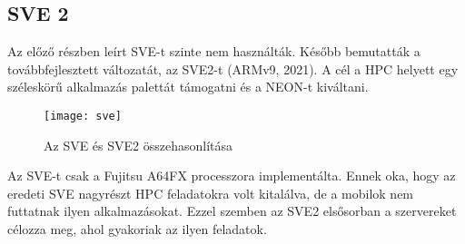 \subsection{SVE 2}
Az előző részben leírt SVE-t szinte nem használták.
Később bemutatták a továbbfejlesztett változatát, az SVE2-t (ARMv9, 2021).
A cél a HPC helyett egy széleskörű alkalmazás palettát támogatni és a NEON-t kiváltani.
\begin{figure}[H]
    \texttt{[image: sve]}
    \centering
    \caption{Az SVE és SVE2 összehasonlítása}
    \label{fig:sve}
\end{figure}
Az SVE-t csak a Fujitsu A64FX processzora implementálta.
Ennek oka, hogy az eredeti SVE nagyrészt HPC feladatokra volt kitalálva, de a mobilok nem futtatnak ilyen alkalmazásokat.
Ezzel szemben az SVE2 elsősorban a szervereket célozza meg, ahol gyakoriak az ilyen feladatok.